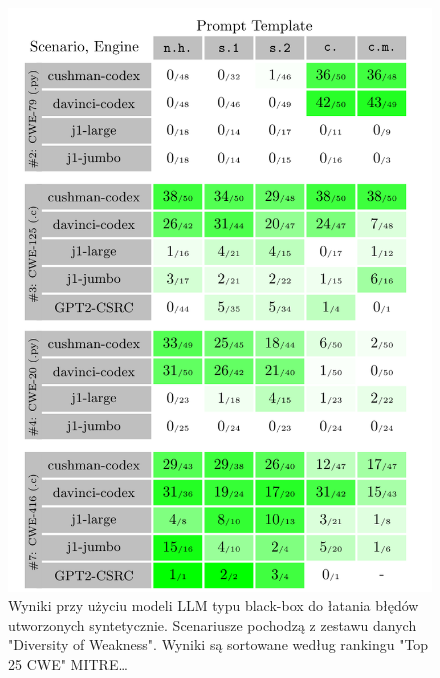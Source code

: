 \begin{figure}[ht]
    \centering
    \begin{minipage}[b]{0.45\textwidth}
        \includegraphics[width=\textwidth]{img/codex-results.png}
        \caption{Wyniki przy użyciu modeli LLM typu black-box do łatania błędów utworzonych syntetycznie. Scenariusze pochodzą z zestawu danych "Diversity of Weakness". Wyniki są sortowane według rankingu "Top 25 CWE" MITRE\dots}
        \label{fig:first_image}
    \end{minipage}
    \hfill
    \begin{minipage}[b]{0.45\textwidth}

\end{minipage}
\end{figure}

